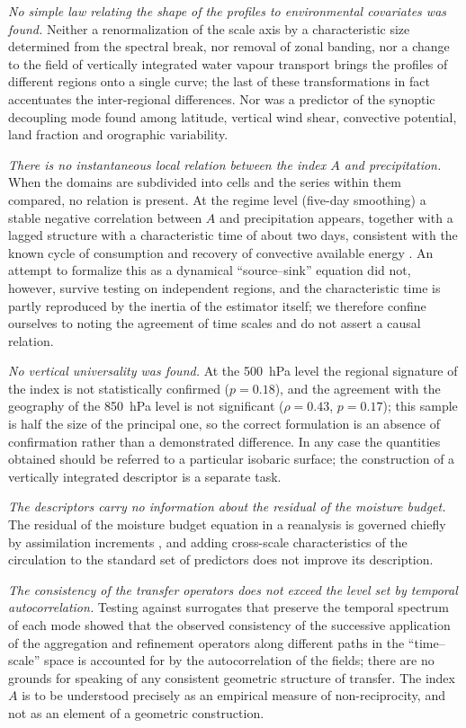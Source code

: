 \documentclass[11pt,a4paper]{article}
\begin{document}
\emph{No simple law relating the shape of the profiles to environmental covariates was found.} Neither a renormalization of the scale axis by a characteristic size determined from the spectral break, nor removal of zonal banding, nor a change to the field of vertically integrated water vapour transport brings the profiles of different regions onto a single curve; the last of these transformations in fact accentuates the inter-regional differences. Nor was a predictor of the synoptic decoupling mode found among latitude, vertical wind shear, convective potential, land fraction and orographic variability.

\emph{There is no instantaneous local relation between the index $A$ and precipitation.} When the domains are subdivided into cells and the series within them compared, no relation is present. At the regime level (five-day smoothing) a stable negative correlation between $A$ and precipitation appears, together with a lagged structure with a characteristic time of about two days, consistent with the known cycle of consumption and recovery of convective available energy \cite{Masunaga2012,PetersNeelin2006}. An attempt to formalize this as a dynamical ``source--sink'' equation did not, however, survive testing on independent regions, and the characteristic time is partly reproduced by the inertia of the estimator itself; we therefore confine ourselves to noting the agreement of time scales and do not assert a causal relation.

\emph{No vertical universality was found.} At the 500~hPa level the regional signature of the index is not statistically confirmed ($p=0.18$), and the agreement with the geography of the 850~hPa level is not significant ($\rho=0.43$, $p=0.17$); this sample is half the size of the principal one, so the correct formulation is an absence of confirmation rather than a demonstrated difference. In any case the quantities obtained should be referred to a particular isobaric surface; the construction of a vertically integrated descriptor is a separate task.

\emph{The descriptors carry no information about the residual of the moisture budget.} The residual of the moisture budget equation in a reanalysis is governed chiefly by assimilation increments \cite{Trenberth1991,Mayer2021}, and adding cross-scale characteristics of the circulation to the standard set of predictors does not improve its description.

\emph{The consistency of the transfer operators does not exceed the level set by temporal autocorrelation.} Testing against surrogates that preserve the temporal spectrum of each mode showed that the observed consistency of the successive application of the aggregation and refinement operators along different paths in the ``time--scale'' space is accounted for by the autocorrelation of the fields; there are no grounds for speaking of any consistent geometric structure of transfer. The index $A$ is to be understood precisely as an empirical measure of non-reciprocity, and not as an element of a geometric construction.
\end{document}
